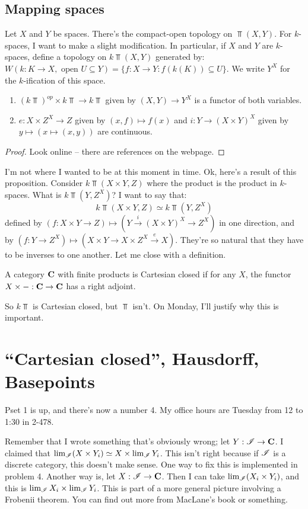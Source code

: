 \section{Mapping spaces}
Let $X$ and $Y$ be spaces. There's the compact-open topology on $\Top(X,Y)$. For $k$-spaces, I want to make a slight modification. In particular, if $X$ and $Y$ are $k$-spaces, define a topology on $k\Top(X,Y)$ generated by: $W(k:K\to X, \text{ open }U\subseteq Y)=\{f:X\to Y: f(k(K))\subseteq U\}$. We write $Y^X$ for the $k$-ification of this space.
\begin{prop}
    \begin{enumerate}
	\item $(k\Top)^{op}\times k\Top\to k\Top$ given by $(X,Y)\to Y^X$ is a functor of both variables.
	\item $e:X\times Z^X\to Z$ given by $(x,f)\mapsto f(x)$ and $i:Y\to (X\times Y)^X$ given by $y\mapsto(x\mapsto(x,y))$ are continuous.
    \end{enumerate}
\end{prop}
\begin{proof}
    Look online -- there are references on the webpage.
\end{proof}
I'm not where I wanted to be at this moment in time. Ok, here's a result of this proposition. Consider $k\Top(X\times Y,Z)$ where the product is the product in $k$-spaces. What is $k\Top(Y,Z^X)$? I want to say that:
$$k\Top(X\times Y,Z)\simeq k\Top(Y,Z^X)$$
defined by $(f:X\times Y\to Z)\mapsto (Y\xrightarrow{i}(X\times Y)^X\to Z^X)$ in one direction, and by $(f:Y\to Z^X)\mapsto(X\times Y\to X\times Z^X\xrightarrow{e} X)$. They're so natural that they have to be inverses to one another. Let me close with a definition.
\begin{definition}
    A category $\mathbf C$ with finite products is Cartesian closed if for any $X$, the functor $X\times -:\mathbf C\to \mathbf C$ has a right adjoint.
\end{definition}
So $k\Top$ is Cartesian closed, but $\Top$ isn't. On Monday, I'll justify why this is important.
\chapter{``Cartesian closed'', Hausdorff, Basepoints}
Pset 1 is up, and there's now a number 4. My office hours are Tuesday from 12 to 1:30 in 2-478.

Remember that I wrote something that's obviously wrong; let $Y:\mathscr I\to\mathbf C$. I claimed that $\lim_\mathscr I (X\times Y_i)\simeq X\times \lim_\mathscr I Y_i$. This isn't right because if $\mathscr I$ is a discrete category, this doesn't make sense. One way to fix this is implemented in problem 4. Another way is, let $X:\mathscr I\to\mathbf C$. Then I can take $\lim_\mathscr I(X_i\times Y_i)$, and this is $\lim_\mathscr I X_i\times \lim_\mathscr I Y_i$. This is part of a more general picture involving a Frobenii theorem. You can find out more from MacLane's book or something.

